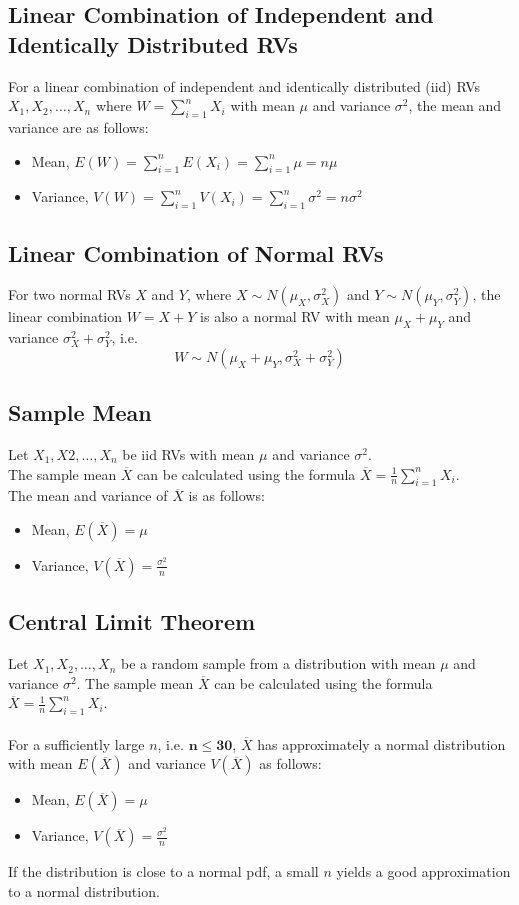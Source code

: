 \documentclass[a4paper]{article}
\begin{document}
\subsection{Linear Combination of Independent and Identically Distributed RVs}
For a linear combination of independent and identically distributed (iid) RVs $X_{1}, X_{2}, \ldots, X_{n}$ where $\displaystyle W = \sum_{i=1}^{n}X_{i}$ with mean $\mu$ and variance $\sigma^2$, the mean and variance are as follows:
\begin{itemize}
    \item Mean, $\displaystyle E(W) = \sum_{i=1}^{n}E(X_{i}) = \sum_{i=1}^{n}\mu = n\mu$
    \item Variance, $\displaystyle V(W) = \sum_{i=1}^{n}V(X_{i}) = \sum_{i=1}^{n}\sigma^2 = n\sigma^2$
\end{itemize}
\newpage
\subsection{Linear Combination of Normal RVs}
For two normal RVs $X$ and $Y$, where $X\sim N(\mu_{X},\sigma^{2}_{X})$ and $Y\sim N(\mu_{Y}, \sigma^2_{Y})$, the linear combination $W = X + Y$ is also a normal RV with mean $\mu_{X} + \mu_{Y}$ and variance $\sigma^2_{X} + \sigma^2_{Y}$, i.e.
$$W\sim N(\mu_{X}+\mu_{Y}, \sigma^{2}_{X}+\sigma^{2}_{Y})$$
\subsection{Sample Mean}
Let $X_{1}, X{2}, \ldots, X_{n}$ be iid RVs with mean $\mu$ and variance $\sigma^2$. \\ The sample mean $\overline{X}$ can be calculated using the formula $\displaystyle \overline{X} = \frac{1}{n}\sum_{i=1}^{n}X_{i}$.\\
The mean and variance of $\overline{X}$ is as follows:
\begin{itemize}
    \item Mean, $E(\overline{X}) = \mu$
    \item Variance, $\displaystyle V(\overline{X}) = \frac{\sigma^2}{n}$
\end{itemize}
\subsection{Central Limit Theorem}
Let $X_{1}, X_{2}, \ldots, X_{n}$ be a random sample from a distribution with mean $\mu$ and variance $\sigma^2$. The sample mean $\overline{X}$ can be calculated using the formula $\displaystyle \overline{X} = \frac{1}{n}\sum_{i=1}^{n}X_{i}$.\\
\\
For a sufficiently large $n$, i.e. $\mathbf{n \leq 30}$, $\overline{X}$ has approximately a normal distribution with mean $E(\overline{X})$ and variance $V(\overline{X})$ as follows:
\begin{itemize}
    \item Mean, $E(\overline{X}) = \mu$
    \item Variance, $\displaystyle V(\overline{X}) = \frac{\sigma^2}{n}$
\end{itemize}
\noindent If the distribution is close to a normal pdf, a small $n$ yields a good approximation to a normal distribution.
\newpage
\end{document}
